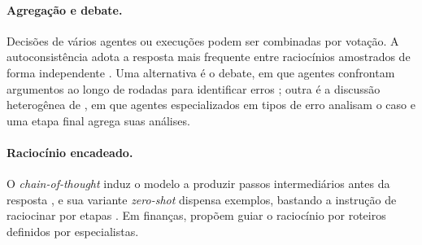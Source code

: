 \paragraph*{Agregação e debate.} Decisões de vários agentes ou execuções podem ser combinadas por votação. A autoconsistência adota a resposta mais frequente entre raciocínios amostrados de forma independente \citep{Wang2023}. Uma alternativa é o debate, em que agentes confrontam argumentos ao longo de rodadas para identificar erros \citep{Du2024}; outra é a discussão heterogênea de \citet{Xing2024}, em que agentes especializados em tipos de erro analisam o caso e uma etapa final agrega suas análises.

\paragraph*{Raciocínio encadeado.} O \textit{chain-of-thought} induz o modelo a produzir passos intermediários antes da resposta \citep{Wei2022}, e sua variante \textit{zero-shot} dispensa exemplos, bastando a instrução de raciocinar por etapas \citep{Kojima2022}. Em finanças, \citet{FinCoT2025} propõem guiar o raciocínio por roteiros definidos por especialistas.
